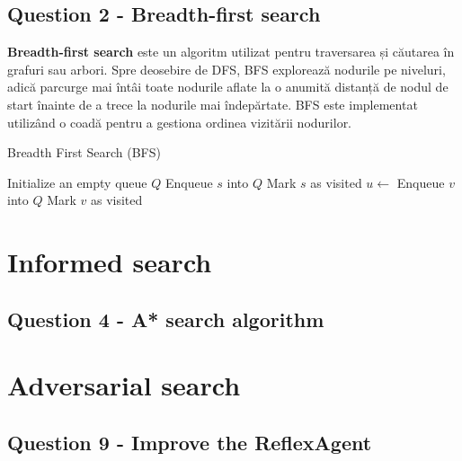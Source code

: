 

\subsection{Question 2 - Breadth-first search}
\par \textbf{Breadth-first search} este un algoritm utilizat pentru traversarea și căutarea în grafuri sau arbori. Spre deosebire de DFS, BFS explorează nodurile pe niveluri, adică parcurge mai întâi toate nodurile aflate la o anumită distanță de nodul de start înainte de a trece la nodurile mai îndepărtate. BFS este implementat utilizând o coadă pentru a gestiona ordinea vizitării nodurilor.

\begin{algorithm}
\caption{Breadth First Search (BFS)}
\begin{algorithmic}[1]
 
    \State Initialize an empty queue $Q$
    \State Enqueue $s$ into $Q$
    \State Mark $s$ as visited
        \State $u \gets$ 
                \State Enqueue $v$ into $Q$
                \State Mark $v$ as visited
            \EndIf
        \EndFor
    \EndWhile
\EndProcedure
\end{algorithmic}
\end{algorithm}
\section{Informed search}
\subsection{Question 4 - A* search  algorithm}

\section{Adversarial search}
\subsection{Question 9 - Improve the ReflexAgent} 
